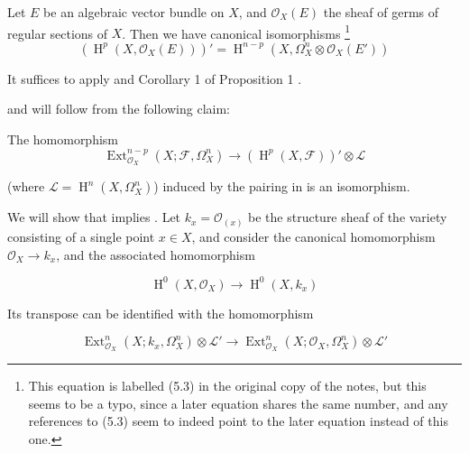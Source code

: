 \begin{corollary}\label{fga1-theorem-3-corollary}
  Let $E$ be an algebraic vector bundle on $X$, and $\mathcal{O}_X(E)$ the sheaf of germs of regular sections of $X$.
  Then we have canonical isomorphisms
  \footnote{This equation is labelled (5.3) in the original copy of the notes, but this seems to be a typo, since a later equation shares the same number, and any references to (5.3) seem to indeed point to the later equation instead of this one.}
  \[(\operatorname{H}^p(X,\mathcal{O}_X(E)))' = \operatorname{H}^{n-p}(X,\Omega_X^n\otimes\mathcal{O}_X(E'))\]
\end{corollary}

\begin{cproof}
It suffices to apply  and Corollary 1 of Proposition 1 .
\end{cproof}

 and  will follow from the following claim:

\begin{statement}\label{fga1-d}
  The homomorphism
  \begin{equation}\tag{5.2 bis}\label{fga1-equation-5.2bis}
    \operatorname{Ext}_{\mathcal{O}_X}^{n-p}(X;\mathcal{F},\Omega_X^n) \to (\operatorname{H}^p(X,\mathcal{F}))'\otimes\mathcal{L}
  \end{equation}

  (where $\mathcal{L}=\operatorname{H}^n(X,\Omega_X^n)$) induced by the pairing in  is an isomorphism.
\end{statement}

We will show that  implies .
Let $k_x=\mathcal{O}_{(x)}$ be the structure sheaf of the variety consisting of a single point $x\in X$, and consider the canonical homomorphism $\mathcal{O}_X\to k_x$, and the associated homomorphism

\begin{equation}\tag{5.3}\label{fga1-equation-5.3}
  \operatorname{H}^0(X,\mathcal{O}_X) \to \operatorname{H}^0(X,k_x)
\end{equation}

Its transpose can be identified with the homomorphism

\begin{equation}\tag{5.4}\label{fga1-equation-5.4}
  \operatorname{Ext}_{\mathcal{O}_X}^n(X;k_x,\Omega_X^n)\otimes\mathcal{L}' \to \operatorname{Ext}_{\mathcal{O}_X}^n(X;\mathcal{O}_X,\Omega_X^n)\otimes\mathcal{L}'
\end{equation}

